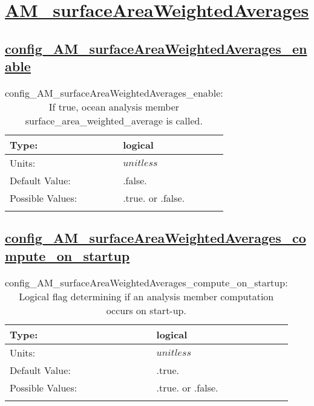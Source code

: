 \section[AM\_surfaceAreaWeightedAverages]{\hyperref[sec:nm_tab_AM_surfaceAreaWeightedAverages]{AM\_surfaceAreaWeightedAverages}}
\label{sec:nm_sec_AM_surfaceAreaWeightedAverages}
\subsection[config\_AM\_surfaceAreaWeightedAverages\_enable]{\hyperref[sec:nm_tab_AM_surfaceAreaWeightedAverages]{config\_AM\_surfaceAreaWeightedAverages\_enable}}
\label{subsec:nm_sec_config_AM_surfaceAreaWeightedAverages_enable}
\begin{center}
\begin{longtable}{| p{2.0in} || p{4.0in} |}
    \hline
    Type: & logical \\
    \hline
    Units: & $unitless$ \\
    \hline
    Default Value: & .false. \\
    \hline
    Possible Values: & .true. or .false. \\
    \hline
    \caption{config\_AM\_surfaceAreaWeightedAverages\_enable: If true, ocean analysis member surface\_area\_weighted\_average is called.}
\end{longtable}
\end{center}
\subsection[config\_AM\_surfaceAreaWeightedAverages\_compute\_on\_startup]{\hyperref[sec:nm_tab_AM_surfaceAreaWeightedAverages]{config\_AM\_surfaceAreaWeightedAverages\_compute\_on\_startup}}
\label{subsec:nm_sec_config_AM_surfaceAreaWeightedAverages_compute_on_startup}
\begin{center}
\begin{longtable}{| p{2.0in} || p{4.0in} |}
    \hline
    Type: & logical \\
    \hline
    Units: & $unitless$ \\
    \hline
    Default Value: & .true. \\
    \hline
    Possible Values: & .true. or .false. \\
    \hline
    \caption{config\_AM\_surfaceAreaWeightedAverages\_compute\_on\_startup: Logical flag determining if an analysis member computation occurs on start-up.}
\end{longtable}
\end{center}
